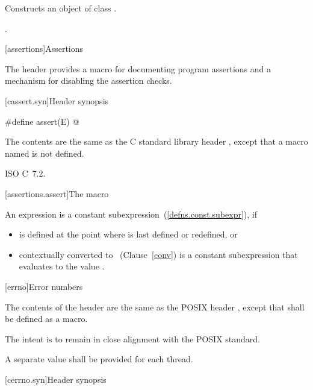 \begin{itemdescr}
\pnum
\effects
Constructs an object of class
.

\pnum
\postconditions
{}.
\end{itemdescr}

[assertions]{Assertions}

\pnum
The header
provides a macro for documenting \Cpp program assertions and a mechanism
for disabling the assertion checks.

[cassert.syn]{Header  synopsis}

%
%
\begin{codeblock}
#define assert(E) @\seebelow@
\end{codeblock}

\pnum
{}%
%
The contents are the same as the C standard library header
,
except that a macro named 
is not defined.

\xref ISO C~7.2.

[assertions.assert]{The  macro}

\pnum
An expression 
is a constant subexpression~(\ref{defns.const.subexpr}), if
\begin{itemize}
\item
{} is defined at the point where 
is last defined or redefined, or
\item
{} contextually converted to ~(Clause~\ref{conv})
is a constant subexpression that evaluates to the value .
\end{itemize}

[errno]{Error numbers}

\pnum
{}%
The contents of the header  are the same as the POSIX header
, except that  shall be defined as a macro.
\begin{note}
The intent is to remain in close alignment with the POSIX standard.
\end{note}
A separate  value shall be provided for each thread.

[cerrno.syn]{Header  synopsis}

